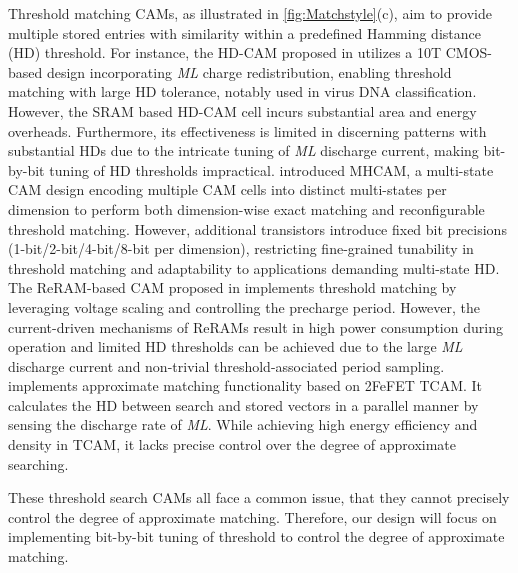 Threshold matching CAMs, as illustrated in \autoref{fig:Matchstyle}(c), aim to provide multiple stored entries with similarity within a predefined Hamming distance (HD) threshold. 
For instance, the HD-CAM proposed in \cite{conventionalCAM} utilizes a 10T CMOS-based design incorporating \textit{ML} charge redistribution, enabling threshold matching with large HD tolerance, notably used in virus DNA classification. However, the SRAM based HD-CAM cell incurs substantial area and energy overheads. Furthermore, its effectiveness is limited in discerning patterns with substantial HDs due to the intricate tuning of \textit{ML} discharge current, making bit-by-bit tuning of HD thresholds impractical.
\cite{liu2023reconfigurable} introduced MHCAM, a multi-state CAM design encoding multiple CAM cells into distinct multi-states per dimension to perform both dimension-wise exact matching and reconfigurable threshold matching. However, additional transistors introduce fixed bit precisions (1-bit/2-bit/4-bit/8-bit per dimension), restricting fine-grained tunability in threshold matching and adaptability to applications demanding multi-state HD. The ReRAM-based CAM proposed in \cite{MASC} implements threshold matching by leveraging voltage scaling and controlling the precharge period. However, the current-driven mechanisms of ReRAMs result in high power consumption during operation and limited HD thresholds can be achieved due to the large \textit{ML} discharge current and non-trivial threshold-associated period sampling. \cite{2FeFETa} implements approximate matching functionality based on 2FeFET TCAM. It calculates the HD between search and stored vectors in a parallel manner by sensing the discharge rate of \textit{ML}. While achieving high energy efficiency and density in TCAM, it lacks precise control over the degree of approximate searching.

These threshold search CAMs all face a common issue, that they cannot precisely control the degree of approximate matching. Therefore, our design will focus on implementing bit-by-bit tuning of threshold to control the degree of approximate matching.








